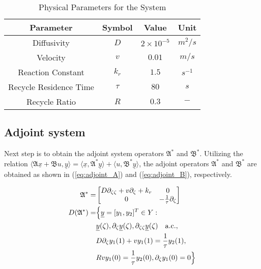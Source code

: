 \begin{table}[ht]
    \centering
    \caption{Physical Parameters for the System}
    \label{tab:pars}
    \begin{tabular}{|c|c|c|c|}
    \hline
    \textbf{Parameter}        & \textbf{Symbol} & \textbf{Value}     & \textbf{Unit}    \\ \hline
    Diffusivity               & $D$             & $2\times10^{-5}$   & ${m^2}/{s}$      \\ \hline
    Velocity                  & $v$             & $0.01$   & ${m}/{s}$        \\ \hline
    Reaction Constant         & $k_r$           & $1.5$              & $s^{-1}$         \\ \hline
    Recycle Residence Time    & $\tau$          & $80$               & $s$              \\ \hline
    Recycle Ratio             & $R$             & $0.3$              & $-$              \\ \hline
    \end{tabular}
\end{table}

\subsection{Adjoint system}

Next step is to obtain the adjoint system operators $\mathfrak{A}^*$ and $\mathfrak{B}^*$. Utilizing the relation $\langle \mathfrak{A} \underline{x} + \mathfrak{B} u, \underline{y}\rangle = \langle \underline{x}, \mathfrak{A}^* \underline{y}\rangle + \langle u, \mathfrak{B}^* \underline{y}\rangle$, the adjoint operators $\mathfrak{A}^*$ and $\mathfrak{B}^*$ are obtained as shown in (\ref{eq:adjoint_A}) and (\ref{eq:adjoint_B}), respectively.


\begin{equation} \label{eq:adjoint_A}
    \begin{aligned}
        {\mathfrak{A}}^{*} =&
        \begin{bmatrix}
            D \partial_{\zeta \zeta} + v \partial_\zeta +k_r & 0\\
            0 & -\frac{1}{\tau} \partial_\zeta
        \end{bmatrix}\\
        D(\mathfrak{A}^*) =& \Bigl\{ \underline{y} = [y_1, y_2]^T \in Y:\\
        &\underline{y}(\zeta), \partial_\zeta \underline{y}(\zeta), \partial_{\zeta \zeta} \underline{y}(\zeta) \quad \mathrm{a.c.},\\
        &D \partial_\zeta y_1(1) + v y_1(1) = \frac{1}{\tau} y_2(1), \\
        &R v y_1(0) = \frac{1}{\tau} y_2(0), 
        \partial_\zeta y_1(0) = 0 \Bigr\}
    \end{aligned}
\end{equation}

